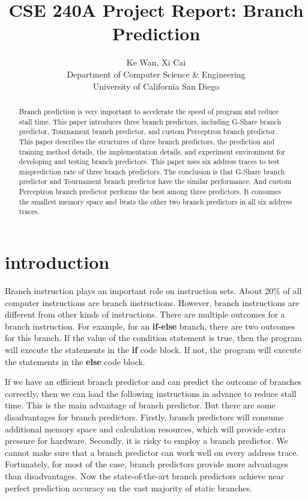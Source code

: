 \documentclass[conference]{IEEEtran}
\title{CSE 240A Project Report: Branch Prediction}
\author{Ke Wan, Xi Cai \\
Department of Computer Science \& Engineering \\
University of California San Diego

}
\begin{document}
\maketitle
\thispagestyle{firstpage}
\pagestyle{plain}




\begin{abstract}

Branch prediction is very important to accelerate the speed of program and reduce stall time. This paper introduces three branch predictors, including G-Share branch predictor, Tournament branch predictor, and custom Perceptron branch predictor. 
This paper describes the structures of three branch predictors, the prediction and training method details, the implementation details, and experiment environment for developing and testing branch predictors. This paper uses six 
address traces to test misprediction rate of three branch predictors. The conclusion is that G-Share branch predictor and Tournament branch predictor have the similar performance. And custom Perceptron branch predictor performs 
the best among three predictors. It consumes the smallest memory space and beats the other two branch predictors in all six address traces. 

\end{abstract}

\section{introduction}
Branch instruction plays an important role on instruction sets. About 20\% of all computer instructions are branch instructions. However, branch instructions are
different from other kinds of instructions. There are multiple outcomes for a branch instruction. For example, for an \textbf{if-else} branch, there are two outcomes for this branch. 
If the value of the condition statement is true, then the program will execute the statements in the \textbf{if} code block. If not, the program will execute the statements
in the \textbf{else} code block. 

If we have an efficient branch predictor and can predict the outcome of branches correctly, then we can load the following instructions in advance to reduce stall time. 
This is the main advantage of branch predictor. But there are some disadvantages for branch predictors. Firstly, branch predictors will consume additional memory space and calculation resources, which will provide 
extra pressure for hardware. Secondly, it is risky to employ a branch predictor. We cannot make sure that a branch predictor can work well on every address trace. Fortunately, for most of the case, branch predictors 
provide more advantages than disadvantages. Now the state-of-the-art branch predictors achieve near perfect prediction accuracy on the vast majority of static branches. 
\end{document}
